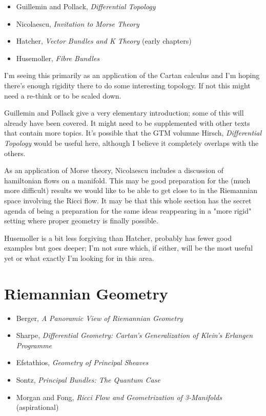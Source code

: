 \documentclass[article]{article}
\begin{document}
\begin{itemize}
	\item{Guillemin and Pollack, \textit{Differential Topology}}
	\item{Nicolaescu, \textit{Invitation to Morse Theory}}
	\item{Hatcher, \textit{Vector Bundles and K Theory} (early chapters)}
	\item{Husemoller, \textit{Fibre Bundles}}
\end{itemize}

I'm seeing this primarily as an application of the Cartan calculus and I'm hoping there's enough rigidity there to do some interesting topology. If not this might need a re-think or to be scaled down.

Guillemin and Pollack give a very elementary introduction; some of this will already have been covered. It might need to be supplemented with other texts that contain more topics. It's possible that the GTM volumne Hirsch, \textit{Differential Topology} would be useful here, although I believe it completely overlaps with the others.

As an application of Morse theory, Nicolaescu includes a discussion of hamiltonian flows on a manifold. This may be good preparation for the (much more difficult) results we would like to be able to get close to in the Riemannian space involving the Ricci flow. It may be that this whole section has the secret agenda of being a preparation for the same ideas reappearing in a "more rigid" setting where proper geometry is finally possible.

Husemoller is a bit less forgiving than Hatcher, probably has fewer good examples but goes deeper; I'm not sure which, if either, will be the most useful yet or what exactly I'm looking for in this area.

\section{Riemannian Geometry}

\begin{itemize}
	\item{Berger, \textit{A Panoramic View of Riemannian Geometry}}
	\item{Sharpe, \textit{Differential Geometry: Cartan’s Generalization of Klein’s Erlangen Programme}}
	\item{Efstathios, \textit{Geometry of Principal Sheaves}}
	\item{Sontz, \textit{Principal Bundles: The Quantum Case}}
	\item{Morgan and Fong, \textit{Ricci Flow and Geometrization of 3-Manifolds} (aspirational)}
\end{itemize}
\end{document}
